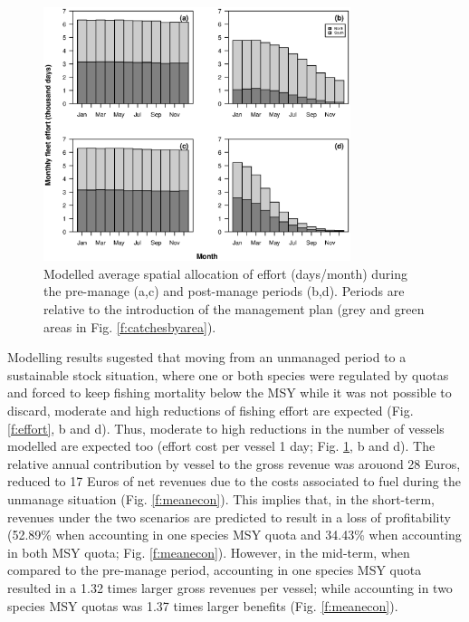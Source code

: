 \documentclass[12pt,oneline,a4paper,numbib]{ouparticle}
\numberwithin{equation}{subsection} %
\begin{document}
\begin{figure}[!ht]
\centering
\includegraphics[width=0.8\textwidth]{Figures/Meaneffort.eps} 
\caption{Modelled average spatial allocation of effort (days/month) during the pre-manage (a,c) and post-manage periods (b,d). Periods are relative to the introduction of the management plan (grey and green areas in Fig. \ref{f:catchesbyarea}).}
\label{f:meaneffort}
\end{figure}

Modelling results sugested that moving from an unmanaged period to a sustainable stock situation, where one or both species were regulated by quotas and forced to keep fishing mortality below the MSY while it was not possible to discard, moderate and high reductions of fishing effort are expected (Fig. \ref{f:effort}, b and d). Thus, moderate to high reductions in the number of vessels modelled are expected too (effort cost per vessel 1 day; Fig. \ref{f:meaneffort}, b and d). The relative annual contribution by vessel to the gross revenue was arouond 28 Euros, reduced to 17 Euros of net revenues due to the costs associated to fuel during the unmanage situation (Fig. \ref{f:meanecon}). This implies that, in the short-term, revenues under the two scenarios are predicted to result in a loss of profitability (52.89\% when accounting in one species MSY quota and 34.43\% when accounting in both MSY quota; Fig. \ref{f:meanecon}). However, in the mid-term, when compared to the pre-manage period, accounting in one species MSY quota resulted in a 1.32 times larger gross revenues per vessel; while accounting in two species MSY quotas was 1.37 times larger benefits (Fig. \ref{f:meanecon}). 
\end{document}
